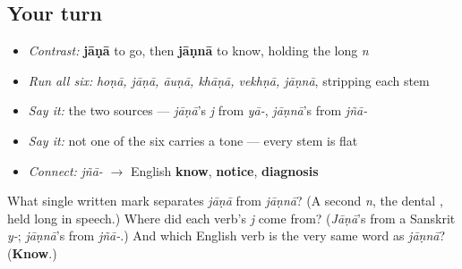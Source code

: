\subsection*{Your turn}
\begin{itemize}
\raggedright
  \item \emph{Contrast:} \textbf{jāṇā} to go, then \textbf{jāṇnā} to know, holding the long \emph{n}
  \item \emph{Run all six:} \emph{hoṇā, jāṇā, āuṇā, khāṇā, vekhṇā, jāṇnā}, stripping each stem
  \item \emph{Say it:} the two sources — \emph{jāṇā}'s \emph{j} from \emph{yā-}, \emph{jāṇnā}'s from \emph{jñā-}
  \item \emph{Say it:} not one of the six carries a tone — every stem is flat
  \item \emph{Connect:} \emph{jñā-} $\to$ English \textbf{know}, \textbf{notice}, \textbf{diagnosis}
\end{itemize}

\begin{tcolorbox}[breakable,colback=teal!4,colframe=teal!35!black,title={Before you move on}]
What single written mark separates \emph{jāṇā} from \emph{jāṇnā}? (A second \emph{n}, the dental \textbf{}, held long in speech.) Where did each verb's \emph{j} come from? (\emph{Jāṇā}'s from a Sanskrit \emph{y-}; \emph{jāṇnā}'s from \emph{jñā-}.) And which English verb is the very same word as \emph{jāṇnā}? (\textbf{Know}.)
\end{tcolorbox}
